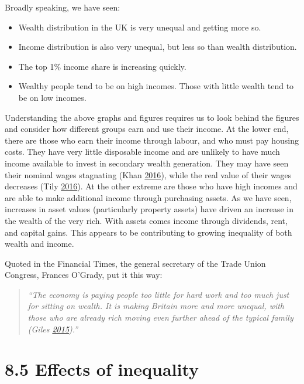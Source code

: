 \documentclass[]{tufte-handout}
\providecommand{\tightlist}{%
  \setlength{\itemsep}{0pt}\setlength{\parskip}{0pt}}
\begin{document}
Broadly speaking, we have seen:

\begin{itemize}
\tightlist
\item
  Wealth distribution in the UK is very unequal and getting more so.
\item
  Income distribution is also very unequal, but less so than wealth
  distribution.
\item
  The top 1\% income share is increasing quickly.
\item
  Wealthy people tend to be on high incomes. Those with little wealth
  tend to be on low incomes.
\end{itemize}

Understanding the above graphs and figures requires us to look behind
the figures and consider how different groups earn and use their income.
At the lower end, there are those who earn their income through labour,
and who must pay housing costs. They have very little disposable income
and are unlikely to have much income available to invest in secondary
wealth generation. They may have seen their nominal wages stagnating
(Khan \protect\hyperlink{ref-Khan2016}{2016}), while the real value of
their wages decreases (Tily \protect\hyperlink{ref-Tily2016}{2016}). At
the other extreme are those who have high incomes and are able to make
additional income through purchasing assets. As we have seen, increases
in asset values (particularly property assets) have driven an increase
in the wealth of the very rich. With assets comes income through
dividends, rent, and capital gains. This appears to be contributing to
growing inequality of both wealth and income.

Quoted in the Financial Times, the general secretary of the Trade Union
Congress, Frances O'Grady, put it this way:

\begin{quote}
\emph{``The economy is paying people too little for hard work and too
much just for sitting on wealth. It is making Britain more and more
unequal, with those who are already rich moving even further ahead of
the typical family (Giles \protect\hyperlink{ref-Giles2015}{2015}).''}
\end{quote}

\hypertarget{effects-of-inequality}{%
\section{8.5 Effects of inequality}\label{effects-of-inequality}}
\end{document}
